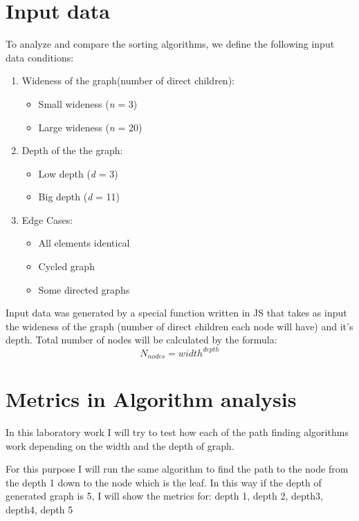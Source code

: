 \documentclass[12pt]{article}
\begin{document}
\clearpage
\section*{Input data}
\hspace{0.8cm}
To analyze and compare the sorting algorithms, we define the following input data conditions:
\begin{enumerate}
    \item Wideness of the graph(number of direct children):
      \begin{itemize}
        \item Small wideness (\textit{n} = 3)  
        \item Large wideness (\textit{n} = 20)  
      \end{itemize}

    \item Depth of the the graph:
      \begin{itemize}
        \item Low depth (\textit{d} = 3)  
        \item Big depth (\textit{d} = 11)
      \end{itemize}

    \item Edge Cases:
      \begin{itemize}
        \item All elements identical
        \item Cycled graph
        \item Some directed graphs
      \end{itemize}
\end{enumerate}

Input data was generated by a special function written in JS that takes as input 
the wideness of the graph (number of direct children each node will have) and it's depth.
Total number of nodes will be calculated by the formula: $$N_{nodes} = width^{depth}$$

\clearpage
\section*{Metrics in Algorithm analysis}

In this laboratory work I will try to test how each of the path finding algorithms work
depending on the width and the depth of graph. 

For this purpose I will run the same algorithm
to find the path to the node from the depth 1 down to the node which is the leaf.
In this way if the depth of generated graph is 5, I will show the metrics for: depth 1, 
depth 2, depth3, depth4, depth 5
\end{document}
